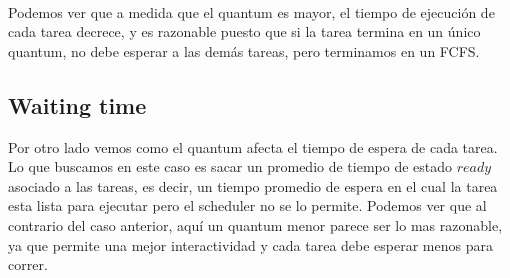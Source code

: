 ~

Podemos ver que a medida que el quantum es mayor, el tiempo de ejecución de cada tarea decrece, y es razonable puesto que si la tarea termina en un único quantum, no debe esperar a las demás tareas, pero terminamos en un FCFS.

\subsection{Waiting time}

Por otro lado vemos como el quantum afecta el tiempo de espera de cada tarea. Lo que buscamos en este caso es sacar un promedio de tiempo de estado $ready$ asociado a las tareas, es decir, un tiempo promedio de espera en el cual la tarea esta lista para ejecutar pero el scheduler no se lo permite.
Podemos ver que al contrario del caso anterior, aquí un quantum menor parece ser lo mas razonable, ya que permite una mejor interactividad y cada tarea debe esperar menos para correr.
